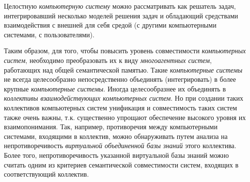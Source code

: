 \begin{SCn}
\begin{scnsubstruct}
{			Целостную \textit{компьютерную систему} можно рассматривать как решатель задач,
			интегрировавший несколько моделей решения задач и обладающий средствами
			взаимодействия с внешней для себя средой (с другими компьютерными системами, с
			пользователями).
			
			Таким образом, для того, чтобы повысить уровень совместимости
			\textit{компьютерных систем}, необходимо преобразовать их к виду
			\textit{многоагентных систем}, работающих над общей семантической памятью.
			Такие \textit{компьютерные системы} не всегда целесообразно непосредственно
			объединять (интегрировать) в более крупные \textit{компьютерные системы}.
			Иногда целесообразнее их объединять в \textit{коллективы взаимодействующих
			компьютерных систем}. Но при создании таких коллективов компьютерных систем
			унификация и совместимость таких систем также очень важны, т.к. существенно
			упрощают обеспечение высокого уровня их взаимопонимания. Так, например,
			противоречия между компьютерными системами, входящими в коллектив, можно
			обнаруживать путем анализа на непротиворечивость \textit{виртуальной
			объединенной базы знаний} этого коллектива. Более того, непротиворечивость
			указанной виртуальной базы знаний можно считать одним из критериев
			семантической совместимости систем, входящих в соответствующий
			коллектив.}
			
\end{scnsubstruct}
\end{SCn}
